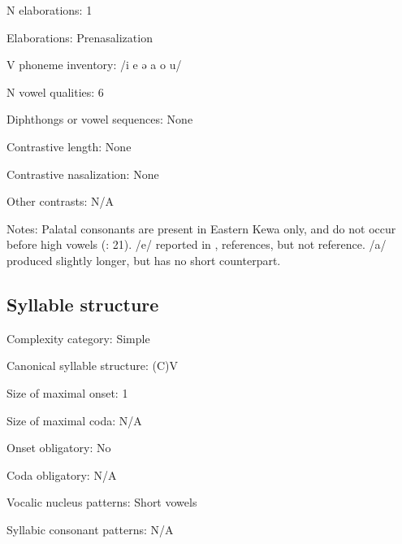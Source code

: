 {\begin{appendixdesc}
\item[N elaborations:] 1

\item[Elaborations:] Prenasalization

\item[V phoneme inventory:] /i e ə a o u/

\item[N vowel qualities:] 6

\item[Diphthongs or vowel sequences:] None

\item[Contrastive length:] None

\item[Contrastive nasalization:] None

\item[Other contrasts:] N/A

\item[Notes:] Palatal consonants are present in Eastern Kewa only, and do not occur before high vowels (\citealt{FranklinFranklin1978}: 21). /e/ reported in \citeyear{Franklin1971}, \citeyear{FranklinFranklin1978} references, but not \citeyear{FranklinFranklin1962} reference. /a/ produced slightly longer, but has no short counterpart.
\end{appendixdesc}
\subsection*{Syllable structure}
\begin{appendixdesc}

\item[Complexity category:] Simple

\item[Canonical syllable structure:] (C)V \citep[11--12]{Franklin1971}

\item[Size of maximal onset:] 1

\item[Size of maximal coda:] N/A

\item[Onset obligatory:] No

\item[Coda obligatory:] N/A

\item[Vocalic nucleus patterns:] Short vowels

\item[Syllabic consonant patterns:] N/A


\end{appendixdesc}}
